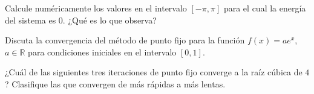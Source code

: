 \begin{questions}
    Calcule numéricamente los valores en el intervalo
    $\left[-\pi,\pi\right]$ para el cual la energía del sistema es
    $0$.
    ¿Qué es lo que observa?


    \question

    Discuta la convergencia del método de punto fijo para la función
    $f\left(x\right)=ae^{x}$, $a\in\mathbb{R}$ para condiciones
    iniciales en el intervalo $\left[0,1\right]$.

    \question

    ¿Cuál de las siguientes tres iteraciones de punto fijo converge a
    la raíz cúbica de $4$?
    Clasifique las que convergen de más rápidas a más lentas.

    \begin{multicols}{3}
    \end{multicols}


\end{questions}
